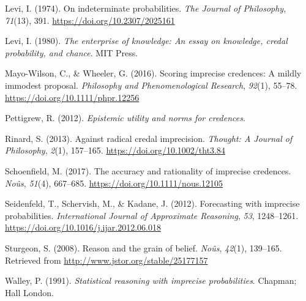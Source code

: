 \documentclass[
  letterpaper,
  DIV=11,
  numbers=noendperiod]{scrartcl}
\newlength{\cslhangindent}
\newlength{\cslentryspacingunit} %
\newenvironment{CSLReferences}[2] %
 {%
  \setlength{\parindent}{0pt}
  \ifodd #1
  \let\oldpar\par
  \def\par{\hangindent=\cslhangindent\oldpar}
  \fi
  \setlength{\parskip}{#2\cslentryspacingunit}
 }%
 {}
\begin{document}
\begin{CSLReferences}{1}{0}
\leavevmode{}%
Levi, I. (1974). On indeterminate probabilities. \emph{The Journal of
Philosophy}, \emph{71}(13), 391. \url{https://doi.org/10.2307/2025161}

\leavevmode{}%
Levi, I. (1980). \emph{The enterprise of knowledge: An essay on
knowledge, credal probability, and chance}. MIT Press.

\leavevmode{}%
Mayo-Wilson, C., \& Wheeler, G. (2016). Scoring imprecise credences: A
mildly immodest proposal. \emph{Philosophy and Phenomenological
Research}, \emph{92}(1), 55--78.
\url{https://doi.org/10.1111/phpr.12256}

\leavevmode{}%
Pettigrew, R. (2012). \emph{Epistemic utility and norms for credences}.

\leavevmode{}%
Rinard, S. (2013). Against radical credal imprecision. \emph{Thought: A
Journal of Philosophy}, \emph{2}(1), 157--165.
\url{https://doi.org/10.1002/tht3.84}

\leavevmode{}%
Schoenfield, M. (2017). The accuracy and rationality of imprecise
credences. \emph{Noûs}, \emph{51}(4), 667--685.
\url{https://doi.org/10.1111/nous.12105}

\leavevmode{}%
Seidenfeld, T., Schervish, M., \& Kadane, J. (2012). Forecasting with
imprecise probabilities. \emph{International Journal of Approximate
Reasoning}, \emph{53}, 1248--1261.
\url{https://doi.org/10.1016/j.ijar.2012.06.018}

\leavevmode{}%
Sturgeon, S. (2008). Reason and the grain of belief. \emph{No{û}s},
\emph{42}(1), 139--165. Retrieved from
\url{http://www.jstor.org/stable/25177157}

\leavevmode{}%
Walley, P. (1991). \emph{Statistical reasoning with imprecise
probabilities}. Chapman; Hall London.

\end{CSLReferences}
\end{document}
